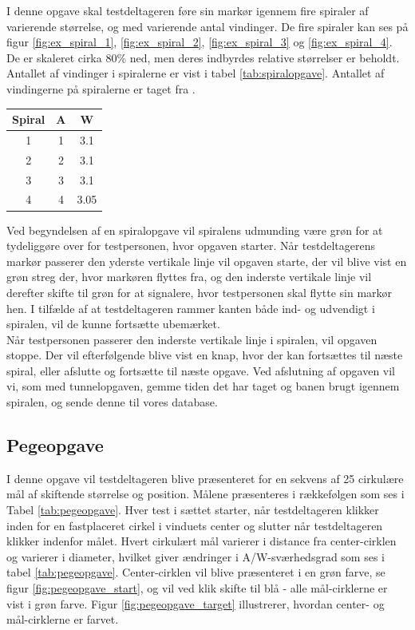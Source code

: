 I denne opgave skal testdeltageren føre sin markør igennem fire spiraler af varierende størrelse, og med varierende antal vindinger. De fire spiraler kan ses på figur \ref{fig:ex_spiral_1}, \ref{fig:ex_spiral_2}, \ref{fig:ex_spiral_3} og \ref{fig:ex_spiral_4}. De er skaleret cirka 80\% ned, men deres indbyrdes relative størrelser er beholdt. Antallet af vindinger i spiralerne er vist i tabel \ref{tab:spiralopgave}. Antallet af vindingerne på spiralerne er taget fra \cite{accot1997}.
\begin{center}
	\begin{tabular}{c c c}
		Spiral & A & W \\
		\hline
		1 & 1 & 3.1 \\
		2 & 2 & 3.1\\
		3 & 3 & 3.1\\
		4 & 4 & 3.05\\
	\end{tabular}
	\label{tab:spiralopgave}
\end{center}
Ved begyndelsen af en spiralopgave vil spiralens udmunding være grøn for at tydeliggøre over for testpersonen, hvor opgaven starter. Når testdeltagerens markør passerer den yderste vertikale linje vil opgaven starte, der vil blive vist en grøn streg der, hvor markøren flyttes fra, og den inderste vertikale linje vil derefter skifte til grøn for at signalere, hvor testpersonen skal flytte sin markør hen. I tilfælde af at testdeltageren rammer kanten både ind- og udvendigt i spiralen, vil de kunne fortsætte ubemærket.\\
Når testpersonen passerer den inderste vertikale linje i spiralen, vil opgaven stoppe. Der vil efterfølgende blive vist en knap, hvor der kan fortsættes til næste spiral, eller afslutte og fortsætte til næste opgave. Ved afslutning af opgaven vil vi, som med tunnelopgaven, gemme tiden det har taget og banen brugt igennem spiralen, og sende denne til vores database.

\subsection*{Pegeopgave}
I denne opgave vil testdeltageren blive præsenteret for en sekvens af 25 cirkulære mål af skiftende størrelse og position. Målene præsenteres i rækkefølgen som ses i Tabel \ref{tab:pegeopgave}. Hver test i sættet starter, når testdeltageren klikker inden for en fastplaceret cirkel i vinduets center og slutter når testdeltageren klikker indenfor målet. Hvert cirkulært mål varierer i distance fra center-cirklen og varierer i diameter, hvilket giver ændringer i A/W-sværhedsgrad som ses i tabel \ref{tab:pegeopgave}. Center-cirklen vil blive præsenteret i en grøn farve, se figur \ref{fig:pegeopgave_start}, og vil ved klik skifte til blå - alle mål-cirklerne er vist i grøn farve. Figur \ref{fig:pegeopgave_target} illustrerer, hvordan center- og mål-cirklerne er farvet. 

